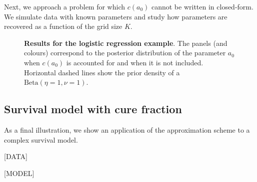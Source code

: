 \documentclass[a4paper, notitlepage, 11pt]{article}
\begin{document}
Next, we approach a problem for which $c(a_0)$ cannot be written in closed-form.
We simulate data with known parameters and study how parameters are recovered as a function of the grid size $K$.

\begin{figure}[!ht]
\hfill
{}
\hfill
{}
\hfill
\caption{\textbf{Results for the logistic regression example}.
The panels (and colours) correspond to the posterior distribution of the parameter $a_0$ when $c(a_0)$ is accounted for and when it is not included.
Horizontal dashed lines show the prior density of a $\text{Beta}(\eta = 1, \nu = 1)$.
}
\label{fig:logistic_regression}
\end{figure}

\subsection{Survival model with cure fraction}
\label{sec:survival}

As a final illustration, we show an application of the approximation scheme to a complex survival model.

[DATA]

[MODEL]
\end{document}

